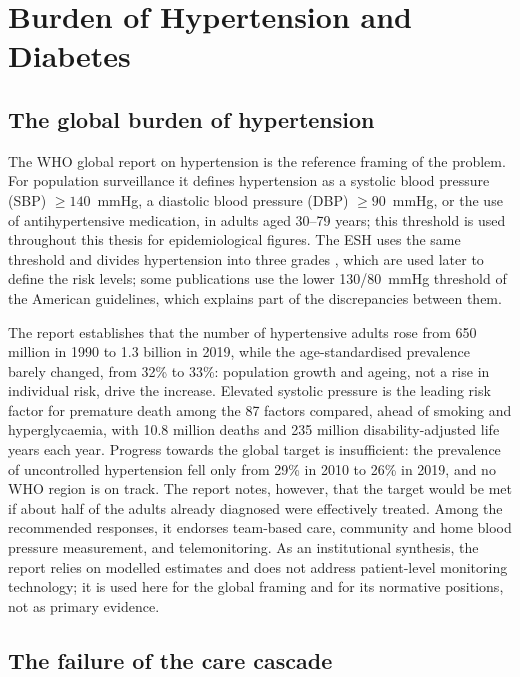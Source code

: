 \section{Burden of Hypertension and Diabetes}\label{sec:burden}\label{sec:hta-burden}

\subsection{The global burden of hypertension}

The WHO global report on hypertension \parencite{who2023hypertension} is the reference framing of the problem. For population surveillance it defines hypertension as a systolic blood pressure (SBP) $\geq 140$~mmHg, a diastolic blood pressure (DBP) $\geq 90$~mmHg, or the use of antihypertensive medication, in adults aged 30--79 years; this threshold is used throughout this thesis for epidemiological figures. The ESH uses the same threshold and divides hypertension into three grades \parencite{mancia2023}, which are used later to define the risk levels; some publications use the lower 130/80~mmHg threshold of the American guidelines, which explains part of the discrepancies between them.

The report establishes that the number of hypertensive adults rose from 650 million in 1990 to 1.3 billion in 2019, while the age-standardised prevalence barely changed, from 32\% to 33\%: population growth and ageing, not a rise in individual risk, drive the increase. Elevated systolic pressure is the leading risk factor for premature death among the 87 factors compared, ahead of smoking and hyperglycaemia, with 10.8 million deaths and 235 million disability-adjusted life years each year. Progress towards the global target is insufficient: the prevalence of uncontrolled hypertension fell only from 29\% in 2010 to 26\% in 2019, and no WHO region is on track. The report notes, however, that the target would be met if about half of the adults already diagnosed were effectively treated. Among the recommended responses, it endorses team-based care, community and home blood pressure measurement, and telemonitoring. As an institutional synthesis, the report relies on modelled estimates and does not address patient-level monitoring technology; it is used here for the global framing and for its normative positions, not as primary evidence.

\subsection{The failure of the care cascade}\label{sec:cascade}

